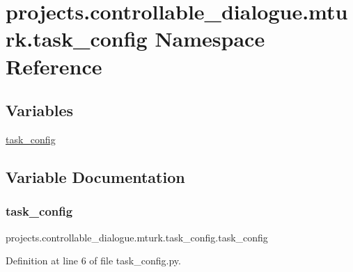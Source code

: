 \hypertarget{namespaceprojects_1_1controllable__dialogue_1_1mturk_1_1task__config}{}\section{projects.\+controllable\+\_\+dialogue.\+mturk.\+task\+\_\+config Namespace Reference}
\label{namespaceprojects_1_1controllable__dialogue_1_1mturk_1_1task__config}
\subsection*{Variables}
\begin{DoxyCompactItemize}
\item 
\hyperlink{namespaceprojects_1_1controllable__dialogue_1_1mturk_1_1task__config_a02846a9f8d649721a33673c0876b53a9}{task\+\_\+config}
\end{DoxyCompactItemize}


\subsection{Variable Documentation}
\mbox{\label{namespaceprojects_1_1controllable__dialogue_1_1mturk_1_1task__config_a02846a9f8d649721a33673c0876b53a9}} 
\subsubsection{\texorpdfstring{task\+\_\+config}{task\_config}}
{\footnotesize\ttfamily projects.\+controllable\+\_\+dialogue.\+mturk.\+task\+\_\+config.\+task\+\_\+config}



Definition at line 6 of file task\+\_\+config.\+py.

